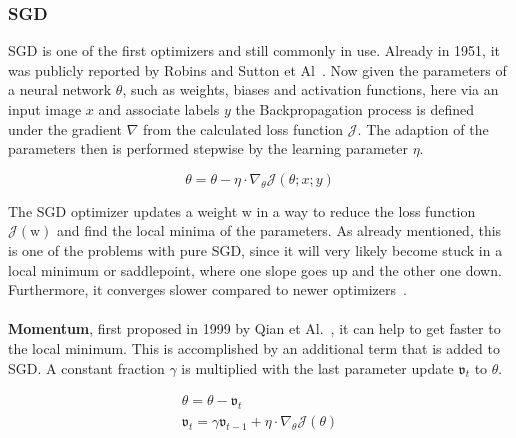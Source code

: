 %

\subsubsection{\gls{SGD}}
\gls{SGD} is one of the first optimizers and still commonly in use.
Already in 1951, it was publicly reported by Robins and Sutton et Al~\cite{sgd}.
Now given the parameters of a neural network $\theta$, such as weights, biases and activation functions, here via an
input image
$x$ and associate labels $y$ the Backpropagation process is defined under the gradient $\nabla$
from the calculated loss function $\mathcal{J}$.
The adaption of the parameters then is performed stepwise by the learning parameter $\eta$.


\begin{equation}
    \theta = \theta - \eta\cdot\nabla_\theta\mathcal{J}(\theta;x;y)
    \label{eqn:sgd}
\end{equation}

The \gls{SGD} optimizer updates a weight $\mathrm{w}$ in a way to reduce the loss function $\mathcal{J}(\mathrm{w})$ and find
the local minima of the parameters.
As already mentioned, this is one of the problems with pure \gls{SGD}, since it will very likely become stuck in a local minimum or
saddlepoint, where one slope goes up and the other one down.
Furthermore, it converges slower compared to newer optimizers~\cite{optimizersoverview, optimizersexplained}.
\\\mbox{}\\
\textbf{Momentum}, first proposed in 1999 by Qian et Al.~\cite{momentum}, it can help to get faster to the local minimum.
This is accomplished by an additional term that is added to \gls{SGD}.
A constant fraction $\gamma$ is multiplied with the last parameter update $\mathfrak{v}_t$ to $\theta$.

\begin{align}
    \theta = \theta - \mathfrak{v}_t \label{eqn:momentum:1}\\
    \mathfrak{v}_t = \gamma\mathfrak{v}_{t-1} + \eta\cdot\nabla_\theta\mathcal{J}(\theta) \label{eqn:momentum:2}
\end{align}

